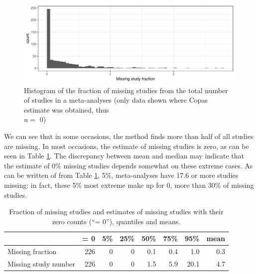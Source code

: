 \documentclass[11pt,a4paper,twoside]{book}\usepackage[]{graphicx}\usepackage[]{color}
\newenvironment{knitrout}{}{} %
\begin{document}
\begin{figure}
\begin{knitrout}
\color{fgcolor}

{\centering \includegraphics[width=\textwidth-3cm]{figure/ch03_figunnamed-chunk-27-1} 

}



\end{knitrout}
\caption{Histogram of the fraction of missing studies from the total number of studies in a meta-analyses (only data shown where Copas estimate was obtained, thus \\$n =$ 0)}
\label{fig:copas.missing}
\end{figure}

We can see that in some occasions, the method finds more than half of all studies are missing. In most occasions, the estimate of missing studies is zero, as can be seen in Table \ref{copas.missing}. The discrepancy between mean and median may indicate that the estimate of 0\% missing studies depends somewhat on these extreme cases. As can be written of from Table \ref{copas.missing}, 5\%,  meta-analyses have 17.6 or more studies missing: in fact, these 5\% most extreme make up for 0, more than 30\% of missing studies.

\begin{table}[ht]
\centering
\begingroup\footnotesize
\begin{tabular}{lrrrrrrr}
  \hline
 & = 0 & 5\% & 25\% & 50\% & 75\% & 95\% & mean \\ 
  \hline
Missing fraction & 226 & 0 & 0 & 0.1 & 0.4 & 1.0 & 0.3 \\ 
  Missing study number & 226 & 0 & 0 & 1.5 & 5.9 & 20.1 & 4.7 \\ 
   \hline
\end{tabular}
\endgroup
\caption{Fraction of missing studies and estimates of missing studies with their zero counts (``= 0''), quantiles and means.} 
\label{copas.missing}
\end{table}
\end{document}
